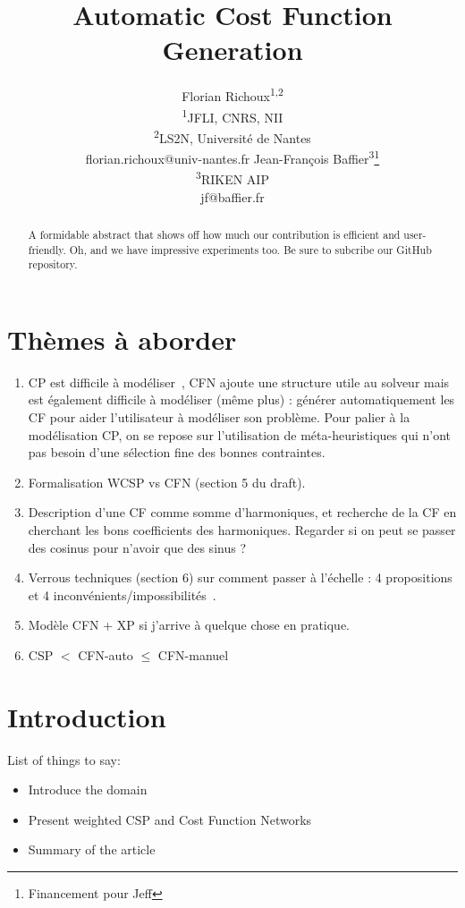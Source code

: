 \documentclass[letterpaper]{article} %
\title{Automatic Cost Function Generation}
\author{Florian Richoux\textsuperscript{\rm 1,2}\\
  \textsuperscript{\rm 1}JFLI, CNRS, NII\\
  \textsuperscript{\rm 2}LS2N, Université de Nantes\\
florian.richoux@univ-nantes.fr %
\And Jean-Fran\c{c}ois Baffier\textsuperscript{\rm 3}\thanks{Financement pour Jeff}\\
\textsuperscript{\rm 3}RIKEN AIP\\
jf@baffier.fr %
}
\begin{document}
\maketitle

\begin{abstract}
A formidable abstract that shows off how much our contribution is efficient and user-friendly. Oh, and we have impressive experiments too. Be sure to subcribe our GitHub repository.
\end{abstract}

\section{Thèmes à aborder}

\begin{enumerate}
\item CP est difficile à modéliser~\cite{Puget2004,Wallace2003}, CFN ajoute une structure utile au
  solveur  mais est  également  difficile à  modéliser  (même plus)  :
  générer  automatiquement   les  CF  pour  aider   l'utilisateur  à
  modéliser  son problème.  Pour palier  à la  modélisation CP,  on se
  repose sur  l'utilisation de méta-heuristiques qui  n'ont pas besoin
  d'une sélection fine des bonnes contraintes. \cite{AMJFH2011,Bessiere2015,CBLS}
\item     Formalisation    WCSP     vs    CFN     (section    5     du
  draft). \cite{Bessiere2011,LK2014}
\item Description d'une CF comme  somme d'harmoniques, et recherche de
  la CF en  cherchant les bons coefficients  des harmoniques. Regarder
  si on peut se passer des cosinus pour n'avoir que des sinus ?
\item Verrous techniques (section 6)  sur comment passer à l'échelle :
  4 propositions et 4 inconvénients/impossibilités~\cite{PR2005}.
\item Modèle CFN + XP si j'arrive à quelque chose en pratique. \cite{Hoos2005}
\item CSP $<$ CFN-auto $\leq$ CFN-manuel
\end{enumerate}

\section{Introduction}\label{sec:introduction}
List of things to say:
\begin{itemize}
  \item Introduce the domain
  \item Present weighted CSP and Cost Function Networks
  \item Summary of the article
\end{itemize}
\end{document}
